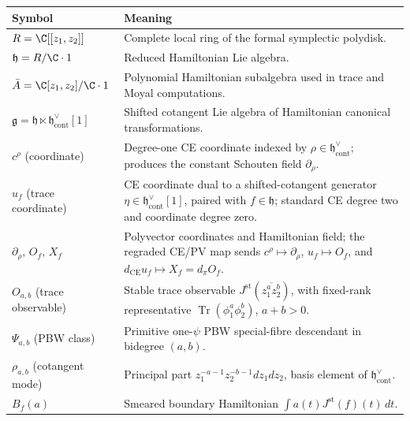 \documentclass[11pt]{memoir}
\begin{document}
\begin{center}
\begin{tabular}{@{}p{}p{}@{}}
\hline
\textbf{Symbol} & \textbf{Meaning}\\
\hline
\(R=\C[[z_1,z_2]]\) &
Complete local ring of the formal symplectic polydisk.\\
\(\mathfrak h=R/\C\cdot1\) &
Reduced Hamiltonian Lie algebra.\\
\(\bar A=\C[z_1,z_2]/\C\cdot1\) &
Polynomial Hamiltonian subalgebra used in trace and Moyal computations.\\
\(\mathfrak g=\mathfrak h\ltimes\mathfrak h^\vee_{\mathrm{cont}}[1]\) &
Shifted cotangent Lie algebra of Hamiltonian canonical transformations.\\
\(c^\rho\) (coordinate) &
Degree-one CE coordinate indexed by
\(\rho\in\mathfrak h^\vee_{\mathrm{cont}}\); produces the constant
Schouten field \(\partial_\rho\).\\
\(u_f\) (trace coordinate) &
CE coordinate dual to a shifted-cotangent generator
\(\eta\in\mathfrak h^\vee_{\mathrm{cont}}[1]\), paired with
\(f\in\mathfrak h\); standard CE degree two and coordinate degree zero.\\
\(\partial_\rho,\,O_f,\,X_f\) &
Polyvector coordinates and Hamiltonian field; the regraded CE/PV map
sends \(c^\rho\mapsto\partial_\rho\), \(u_f\mapsto O_f\), and
\(d_{\mathrm{CE}}u_f\mapsto X_f=d_\pi O_f\).\\
\(O_{a,b}\) (trace observable) &
Stable trace observable
\(J^{\mathrm{st}}(\overline{z_1^az_2^b})\), with fixed-rank
representative \(\operatorname{Tr}(\phi_1^a\phi_2^b)\), \(a+b>0\).\\
\(\Psi_{a,b}\) (PBW class) &
Primitive one-\(\psi\) PBW special-fibre descendant in bidegree
\((a,b)\).\\
\(\rho_{a,b}\) (cotangent mode) &
Principal part \(z_1^{-a-1}z_2^{-b-1}dz_1dz_2\), basis element of
\(\mathfrak h^\vee_{\mathrm{cont}}\).\\
\(B_f(a)\) &
Smeared boundary Hamiltonian
\(\int a(t)J^{\mathrm{st}}(f)(t)\,dt\).\\
\hline
\end{tabular}
\end{center}
\end{document}
